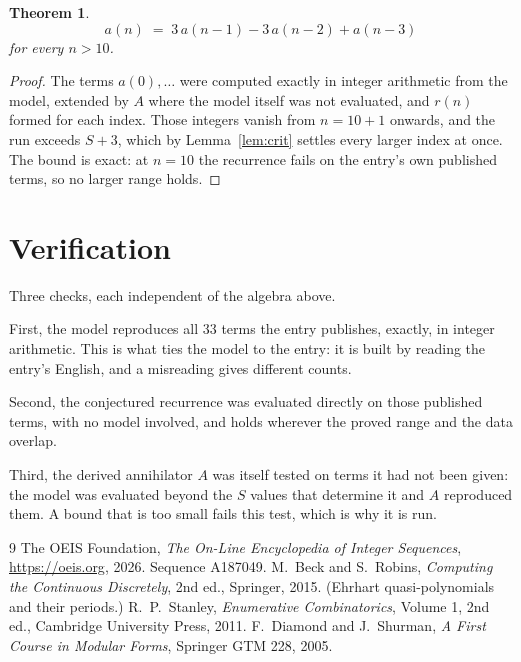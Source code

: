 \documentclass[11pt,a4paper]{article}
\theoremstyle{plain}
\newtheorem{theorem}{Theorem}
\theoremstyle{definition}
\begin{document}
\begin{theorem}
\[
a(n)\;=\;3\,a(n-1) - 3\,a(n-2) + a(n-3)
\]
for every $n>10$.
\end{theorem}

\begin{proof}
The terms $a(0),\dots$ were computed exactly in integer arithmetic from the model, extended by
$A$ where the model itself was not evaluated, and $r(n)$ formed for each index. Those integers
vanish from $n=10+1$ onwards, and the run exceeds $S+3$, which by
Lemma~\ref{lem:crit} settles every larger index at once. The bound is exact: at $n=10$ the recurrence fails on the entry's own published terms, so no larger range holds.
\end{proof}

\section{Verification}

Three checks, each independent of the algebra above.

First, the model reproduces all $33$ terms the entry publishes, exactly, in integer
arithmetic. This is what ties the model to the entry: it is built by reading the entry's
English, and a misreading gives different counts.

Second, the conjectured recurrence was evaluated directly on those published terms, with no
model involved, and holds wherever the proved range and the data overlap.

Third, the derived annihilator $A$ was itself tested on terms it had not been given: the model
was evaluated beyond the $S$ values that determine it and $A$ reproduced them. A bound that is
too small fails this test, which is why it is run.

\begin{thebibliography}{9}
 The OEIS Foundation, \emph{The On-Line Encyclopedia of Integer
Sequences}, \url{https://oeis.org}, 2026. Sequence A187049.
 M.~Beck and S.~Robins, \emph{Computing the Continuous Discretely},
2nd ed., Springer, 2015. (Ehrhart quasi-polynomials and their periods.)
 R.~P.~Stanley, \emph{Enumerative Combinatorics}, Volume 1, 2nd ed.,
Cambridge University Press, 2011.
 F.~Diamond and J.~Shurman, \emph{A First Course in Modular Forms},
Springer GTM 228, 2005.
\end{thebibliography}
\end{document}
